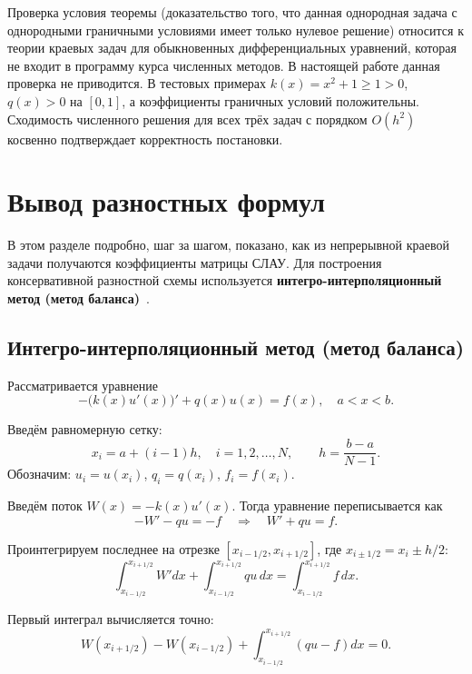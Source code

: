 \documentclass[14pt,a4paper]{extarticle}  %
\numberwithin{equation}{section}
\begin{document}
Проверка условия теоремы (доказательство того, что данная однородная задача с однородными граничными условиями имеет только нулевое решение) относится к теории краевых задач для обыкновенных дифференциальных уравнений, которая не входит в программу курса численных методов. В настоящей работе данная проверка не приводится. В тестовых примерах $k(x) = x^2 + 1 \ge 1 > 0$, $q(x) > 0$ на $[0,1]$, а коэффициенты граничных условий положительны. Сходимость численного решения для всех трёх задач с порядком $O(h^2)$ косвенно подтверждает корректность постановки.
\newpage
\section{Вывод разностных формул}

В этом разделе подробно, шаг за шагом, показано, как из непрерывной 
краевой задачи получаются коэффициенты матрицы СЛАУ. Для построения 
консервативной разностной схемы используется 
\textbf{интегро-интерполяционный метод (метод баланса)}~\cite{balans_method}.

\subsection{Интегро-интерполяционный метод (метод баланса)}

Рассматривается уравнение
\begin{equation}
    -\bigl(k(x)u'(x)\bigr)' + q(x)u(x) = f(x), \quad a < x < b.
\end{equation}

Введём равномерную сетку:
\[
x_i = a + (i-1)h, \quad i = 1, 2, \dots, N, \qquad h = \frac{b-a}{N-1}.
\]
Обозначим: $u_i = u(x_i)$, $q_i = q(x_i)$, $f_i = f(x_i)$.

Введём поток \(W(x) = -k(x)u'(x)\). Тогда уравнение переписывается как
\begin{equation}
    -W' - q u = -f \quad\Rightarrow\quad W' + q u = f.
\end{equation}

Проинтегрируем последнее на отрезке \([x_{i-1/2}, x_{i+1/2}]\), где 
\(x_{i\pm1/2} = x_i \pm h/2\):
\begin{equation}
    \int_{x_{i-1/2}}^{x_{i+1/2}} W' dx + \int_{x_{i-1/2}}^{x_{i+1/2}} q u \, dx = \int_{x_{i-1/2}}^{x_{i+1/2}} f \, dx.
\end{equation}

Первый интеграл вычисляется точно:
\begin{equation}
    W(x_{i+1/2}) - W(x_{i-1/2}) + \int_{x_{i-1/2}}^{x_{i+1/2}} (q u - f) dx = 0.
\end{equation}
\end{document}
